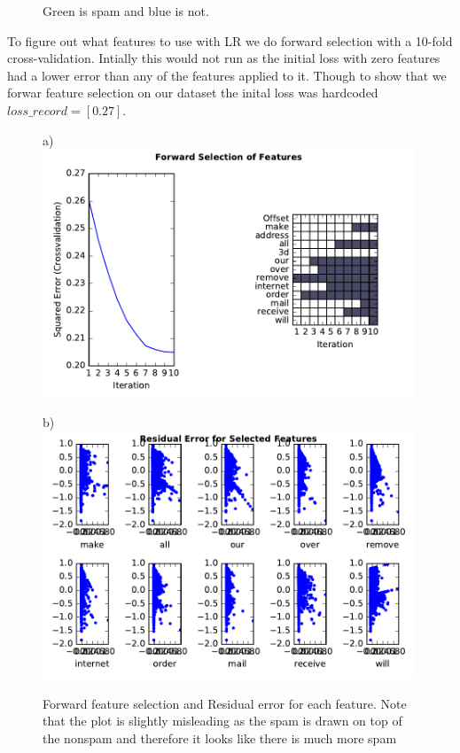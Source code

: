 \documentclass[11pt, paper=a4]{article}
\begin{document}
\begin{figure}[h]
\begin{minipage}{0.3\textwidth}
  \end{minipage} \vfill
  \caption{\label{fig:modelcheck} Green is spam and blue is not.}
\end{figure}


\newpage
To figure out what features to use with LR we do forward selection
with a 10-fold cross-validation. Intially this would not run as the
initial loss with zero features had a lower error than any of the
features applied to it. Though to show that we forwar feature
selection on our dataset the inital loss was hardcoded
$loss\_record=[0.27]$.

\begin{figure}[h]
  \begin{minipage}{0.5\textwidth}
    a)\\
    \includegraphics[width = 0.99\textwidth]{../../src/img/best_forward_selection.pdf}
  \end{minipage} \hfill
  \begin{minipage}{0.5\textwidth}
    b)\\
    \includegraphics[width = 0.99\textwidth]{../../src/img/residual_error.pdf}
  \end{minipage} \hfill
  \caption{\label{fig:residual-error} Forward feature selection and
    Residual error for each feature. Note that the plot is slightly
    misleading as the spam is drawn on top of the nonspam and
    therefore it looks like there is much more spam}
\end{figure}
\end{document}
